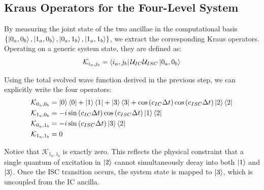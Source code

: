 \documentclass[a4paper,12pt]{article}
\begin{document}
\subsection{Kraus Operators for the Four-Level System}
\label{sub:Kraus_Operators_ISC}

By measuring the joint state of the two ancillae in the computational basis \newline
$ \{ \ket{0_a, 0_b}, \ket{1_a, 0_b}, \ket{0_a, 1_b}, \ket{1_a, 1_b} \} $, we extract the corresponding Kraus operators. Operating on a generic system state, they are defined as:
\begin{equation}
	\mathcal{K}_{i_a, j_b} = \bra{i_a, j_b} \mathcal{U}_{IC} \mathcal{U}_{ISC} \ket{0_a, 0_b}
\end{equation}

Using the total evolved wave function derived in the previous step, we can explicitly write the four operators:
\begin{align}
	\mathcal{K}_{0_a, 0_b} &= \ket{0}\bra{0} + \ket{1}\bra{1} + \ket{3}\bra{3} + \cos \left( c_{IC} \Delta t \right) \cos \left( c_{ISC} \Delta t \right) \ket{2}\bra{2} \\
	\mathcal{K}_{1_a, 0_b} &= -i \sin \left( c_{IC} \Delta t \right) \cos \left( c_{ISC} \Delta t \right) \ket{1}\bra{2} \\
	\mathcal{K}_{0_a, 1_b} &= -i \sin \left( c_{ISC} \Delta t \right) \ket{3}\bra{2} \\
	\mathcal{K}_{1_a, 1_b} &= 0
\end{align}

Notice that $ \mathcal{K}_{1_a, 1_b} $ is exactly zero. This reflects the physical constraint that a single quantum of excitation in $ \ket{2} $ cannot simultaneously decay into both $ \ket{1} $ and $ \ket{3} $. Once the ISC transition occurs, the system state is mapped to $ \ket{3} $, which is uncoupled from the IC ancilla.
\end{document}
